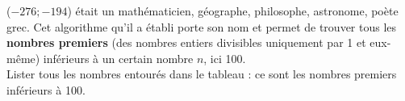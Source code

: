 \begin{changemargin}{-10mm}{-15mm}
\begin{activite}
         ($-276 ; -194$) était un mathématicien, géographe, philosophe, astronome, poète grec. Cet algorithme qu'il a établi porte son nom et permet de trouver tous les {\bf nombres premiers} (des nombres entiers divisibles uniquement par 1 et eux-même) inférieurs à un certain nombre $n$, ici 100. \\ [3mm]
        Lister tous les nombres entourés dans le tableau : ce sont les nombres premiers inférieurs à 100. \par \medskip
        \pointilles \par \medskip
        \pointilles
    \end{activite}
    \vspace*{-20mm}
\end{changemargin}